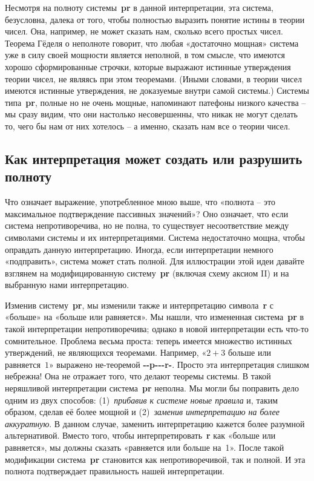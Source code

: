 \documentclass[../main.tex]{subfiles}
\begin{document}
Несмотря на полноту системы~\textbf{pr} в данной интерпретации, эта система, безусловна, далека от того, чтобы полностью выразить понятие истины в теории чисел. Она, например, не может сказать нам, сколько всего простых чисел. Теорема Гёделя о неполноте говорит, что любая «достаточно мощная» система уже в силу своей мощности является неполной, в том смысле, что имеются хорошо сформированные строчки, которые выражают истинные утверждения теории чисел, не являясь при этом теоремами. (Иными словами, в теории чисел имеются истинные утверждения, не доказуемые внутри самой системы.) Системы типа~\textbf{pr}, полные но не очень мощные, напоминают патефоны низкого качества \--- мы сразу видим, что они настолько несовершенны, что никак не могут сделать то, чего бы нам от них хотелось \--- а именно, сказать нам все о теории чисел.


\subsection{Как интерпретация может создать или разрушить полноту}

Что означает выражение, употребленное мною выше, что «полнота \--- это максимальное подтверждение пассивных значений»? Оно означает, что если система непротиворечива, но не полна, то существует несоответствие между символами системы и их интерпретациями. Система недостаточно мощна, чтобы оправдать данную интерпретацию. Иногда, если интерпретации немного «подправить», система может стать полной. Для иллюстрации этой идеи давайте взглянем на модифицированную систему~\textbf{pr} (включая схему аксиом II) и на выбранную нами интерпретацию.

Изменив систему~\textbf{pr}, мы изменили также и интерпретацию символа~\textbf{r} с «больше» на «больше или равняется». Мы нашли, что измененная система~\textbf{pr} в такой интерпретации непротиворечива; однако в новой интерпретации есть что-то сомнительное. Проблема весьма проста: теперь имеется множество истинных утверждений, не являющихся теоремами.
Например, «$2 + 3$ больше или равняется~$1$» выражено не-теоремой \textbf{-{}-p-{}-{}-r-}.
Просто эта интерпретация слишком небрежна!
Она не отражает того, что делают теоремы системы.
В такой неряшливой интерпретации система~\textbf{pr} неполна. Мы могли бы поправить дело одним из двух способов: (1)~\emph{прибавив к системе новые правила} и, таким образом, сделав её более мощной и (2)~\emph{заменив интерпретацию на более аккуратную}. В данном случае, заменить интерпретацию кажется более разумной альтернативой. Вместо того, чтобы интерпретировать~\textbf{r} как «больше или равняется», мы должны сказать «равняется или больше на~1». После такой модификации система~\textbf{pr} становится как непротиворечивой, так и полной. И эта полнота подтверждает правильность нашей интерпретации.
\end{document}
